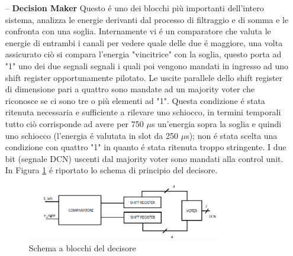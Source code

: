 \documentclass[a4paper, titlepage]{article}
\begin{document}
\begin{itemize}
    \item [--] \textbf{Decision Maker}
        Questo é uno dei blocchi più importanti dell'intero sistema, analizza le energie derivanti dal processo di filtraggio e di somma e le confronta con una soglia. 
        \newline
        Internamente vi é un comparatore che valuta le energie di entrambi i canali per vedere quale delle due é maggiore, una volta assicurato ciò si compara l'energia "vincitrice" con la soglia, questo porta ad "1" uno dei due segnali segnali i quali poi vengono mandati in ingresso ad uno shift register opportunamente pilotato.
        Le uscite parallele dello shift register di dimensione pari a quattro sono mandate ad un majority voter che riconosce se ci sono tre o più elementi ad "1". Questa condizione é stata ritenuta necessaria e sufficiente a rilevare uno schiocco, in termini temporali tutto ciò corrisponde ad avere per 750 $\mu$s un'energia sopra la soglia e quindi uno schiocco (l'energia é valutata in slot da 250 $\mu$s); non é stata scelta una condizione con quattro "1" in quanto é stata ritenuta troppo stringente. I due bit (segnale DCN) uscenti dal majority voter sono mandati alla control unit.
        In Figura \ref{fig:decisore_schematic} é riportato lo schema di principio del decisore.
        
        \begin{figure}[H]
        \centering
        \includegraphics[width=0.8\textwidth]{decisore.png}
        \caption{Schema a blocchi del decisore}
        \label{fig:decisore_schematic}
        \end{figure}
        

\end{itemize}
\end{document}
